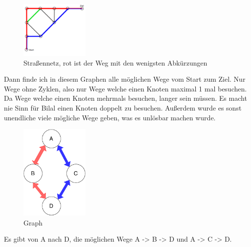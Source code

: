 \documentclass[a4paper,12pt,arial]{scrartcl}
\begin{document}
\begin{figure}
    \includegraphics[width=0.3\textwidth]{aufgabe3.pdf}
    \caption{Straßennetz, rot ist der Weg mit den wenigsten Abkürzungen}
    \label{fig:abbiegen}
\end{figure}

\par
Dann finde ich in diesem Graphen alle möglichen Wege vom Start zum Ziel.
Nur Wege ohne Zyklen, also nur Wege welche einen Knoten maximal 1 mal besuchen. Da Wege welche einen Knoten mehrmals besuchen, langer sein müssen.
Es macht nie Sinn für Bilal einen Knoten doppelt zu besuchen.
Außerdem wurde es sonst unendliche viele mögliche Wege geben, was es unlösbar machen wurde.

\begin{figure}
    \centering
    \includegraphics[width=0.3\textwidth]{small_example_graph.pdf}
    \caption{Graph}
    \label{fig:abbiegen}
\end{figure}
\par
Es gibt von A nach D, die möglichen Wege A -> B -> D und A -> C -> D.
\end{document}
